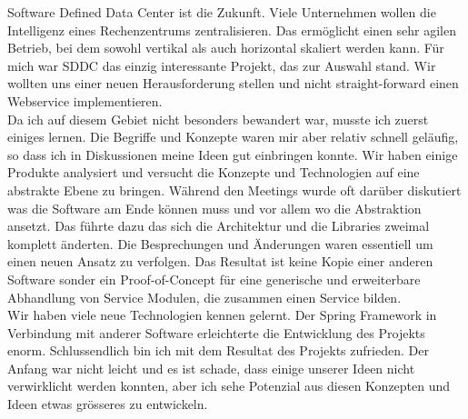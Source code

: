 Software Defined Data Center ist die Zukunft. Viele Unternehmen wollen die Intelligenz eines Rechenzentrums zentralisieren. Das ermöglicht einen sehr agilen Betrieb, bei dem sowohl vertikal als auch horizontal skaliert werden kann. Für mich war SDDC das einzig interessante Projekt, das zur Auswahl stand. Wir wollten uns einer neuen Herausforderung stellen und nicht straight-forward einen Webservice implementieren.\\

Da ich auf diesem Gebiet nicht besonders bewandert war, musste ich zuerst einiges lernen. Die Begriffe und Konzepte waren mir aber relativ schnell geläufig, so dass ich in Diskussionen meine Ideen gut einbringen konnte. Wir haben einige Produkte analysiert und versucht die Konzepte und Technologien auf eine abstrakte Ebene zu bringen. Während den Meetings wurde oft darüber diskutiert was die Software am Ende können muss und vor allem wo die Abstraktion ansetzt. Das führte dazu das sich die Architektur und die Libraries zweimal komplett änderten. Die Besprechungen und Änderungen waren essentiell um einen neuen Ansatz zu verfolgen. Das Resultat ist keine Kopie einer anderen Software sonder ein Proof-of-Concept für eine generische und erweiterbare Abhandlung von Service Modulen, die zusammen einen Service bilden.\\

Wir haben viele neue Technologien kennen gelernt. Der Spring Framework in Verbindung mit anderer Software erleichterte die Entwicklung des Projekts enorm. Schlussendlich bin ich mit dem Resultat des Projekts zufrieden. Der Anfang war nicht leicht und es ist schade, dass einige unserer Ideen nicht verwirklicht werden konnten, aber ich sehe Potenzial aus diesen Konzepten und Ideen etwas grösseres zu entwickeln.